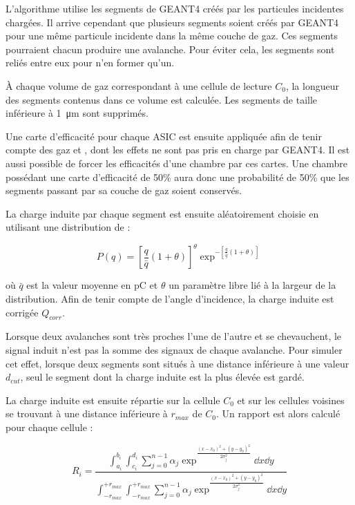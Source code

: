 L'algorithme utilise les segments de GEANT4 créés par les particules incidentes chargées. Il arrive cependant que plusieurs segments soient créés par GEANT4 pour une même particule incidente dans la même couche de gaz. Ces segments pourraient chacun produire une avalanche. Pour éviter cela, les segments sont reliés entre eux pour n'en former qu'un.

 À chaque volume de gaz correspondant à une cellule de lecture $C_{0}$, la longueur des segments contenus dans ce volume est calculée. Les segments de taille inférieure à \SI{1}{\micro\meter} sont supprimés.
 
 Une carte d'efficacité pour chaque ASIC est ensuite appliquée afin de tenir compte des gaz  et , dont les effets ne sont pas pris en charge par GEANT4. Il est aussi possible de forcer les efficacités d'une chambre par ces cartes. Une chambre possédant une carte d'efficacité de 50\% aura donc une probabilité de 50\% que les segments passant par sa couche de gaz soient conservés.
 
 La charge induite par chaque segment est ensuite aléatoirement choisie en utilisant une distribution de :
 
 \begin{equation}
 P(q)=\left[\frac{q}{\bar{q}}(1+\theta)\right]^\theta\exp^{-\left[\frac{q}{\bar{q}}(1+\theta)\right]}
 \end{equation}
 
 où $\bar{q}$ est la valeur moyenne en \si{\pico\coulomb} et $\theta$ un paramètre libre lié à la largeur de la distribution. Afin de tenir compte de l'angle d'incidence, la charge induite est corrigée $Q_{corr}$.
 
 Lorsque deux avalanches sont très proches l'une de l'autre et se chevauchent, le signal induit n'est pas la somme des signaux de chaque avalanche. Pour simuler cet effet, lorsque deux segments sont situés à une distance inférieure à une valeur $d_{cut}$, seul le segment dont la charge induite est la plus élevée est gardé.
 
 La charge induite est ensuite répartie sur la cellule $C_0$ et sur les cellules voisines se trouvant à une distance inférieure à $r_{max}$ de $C_0$. Un rapport est alors calculé pour chaque cellule :
 
 \begin{equation}
 R_i=\frac{\int_{a_i}^{b_i}\int_{c_i}^{d_i}\sum_{j=0}^{n-1}\alpha_j\exp^{\frac{(x-x_0)^2+(y-y_0)^2}{2\sigma_j^2}}\dd x\dd y}{\int_{-r_{max}}^{+r_{max}}\int_{-r_{max}}^{+r_{max}}\sum_{j=0}^{n-1}\alpha_j\exp^{\frac{(x-x_0)^2+(y-y_0)^2}{2\sigma_j^2}}\dd x\dd y}
 \end{equation}
 
